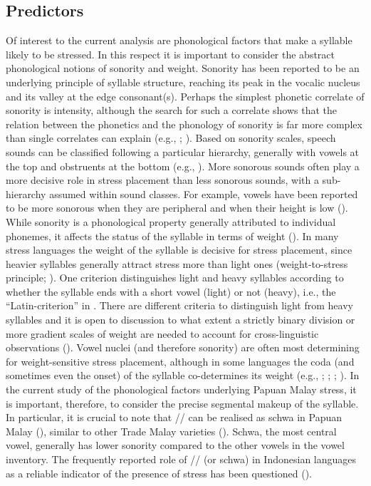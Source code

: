 \subsection{Predictors}
Of interest to the current analysis are phonological factors that make a syllable likely to be stressed. In this respect it is important to consider the abstract phonological notions of sonority and weight. Sonority has been reported to be an underlying principle of syllable structure, reaching its peak in the vocalic nucleus and its valley at the edge consonant(s). Perhaps the simplest phonetic correlate of sonority is intensity, although the search for such a correlate shows that the relation between the phonetics and the phonology of sonority is far more complex than single correlates can explain (e.g., \citealt{parker_quantifying_2002}; \citealt{albert_model_2023}). Based on sonority scales, speech sounds can be classified following a particular hierarchy, generally with vowels at the top and obstruents at the bottom (e.g., \citealt{clements_role_1990}). More sonorous sounds often play a more decisive role in stress placement than less sonorous sounds, with a sub-hierarchy assumed within sound classes. For example, vowels have been reported to be more sonorous when they are peripheral and when their height is low (\citealt[27]{parker_quantifying_2002}). While sonority is a phonological property generally attributed to individual phonemes, it affects the status of the syllable in terms of weight (\citealt{gordon_syllable_2013}). In many stress languages the weight of the syllable is decisive for stress placement, since heavier syllables generally attract stress more than light ones (weight-to-stress principle; \citealt{chomsky_sound_1968}). One criterion distinguishes light and heavy syllables according to whether the syllable ends with a short vowel (light) or not (heavy), i.e., the ``Latin-criterion'' in \citet{ryan_phonological_2016}. There are different criteria to distinguish light from heavy syllables and it is open to discussion to what extent a strictly binary division or more gradient scales of weight are needed to account for cross-linguistic observations (\citealt{ryan_phonological_2016}). Vowel nuclei (and therefore sonority) are often most determining for weight-sensitive stress placement, although in some languages the coda (and sometimes even the onset) of the syllable co-determines its weight (e.g., \citealt{goedemans_weightless_1998}; \citealt{gordon_perceptually-driven_2005}; \citealt{hayes_metrical_1995}; \citealt{ryan_onsets_2014}). In the current study of the phonological factors underlying Papuan Malay stress, it is important, therefore, to consider the precise segmental makeup of the syllable. In particular, it is crucial to note that // can be realised as schwa in Papuan Malay (\citealt{kluge_grammar_2017}), similar to other Trade Malay varieties (\citealt{paauw_malay_2009}). Schwa, the most central vowel, generally has lower sonority compared to the other vowels in the vowel inventory. The frequently reported role of // (or schwa) in Indonesian languages as a reliable indicator of the presence of stress has been questioned (\citealt{goedemans_no_2014}).\par


